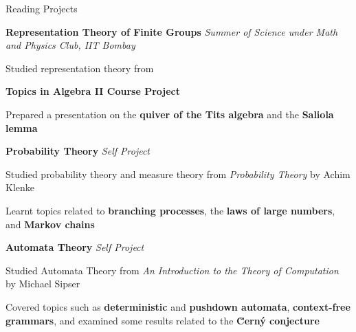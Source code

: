 \begin{rubric}{Reading Projects}

	\entry*[2022] \textbf{Representation Theory of Finite Groups} \hfill \emph{Summer of Science under Math and Physics Club, IIT Bombay}

		Studied representation theory from

		

	\entry*[2020\phantom{}] \textbf{Topics in Algebra II Course Project}

		Prepared a presentation on the \textbf{quiver of the Tits algebra} and the \textbf{Saliola lemma}

	\entry*[2020] \textbf{Probability Theory} \hfill \textit{Self Project}

		Studied probability theory and measure theory from \textit{Probability Theory} by Achim Klenke

		Learnt topics related to \textbf{branching processes}, the \textbf{laws of large numbers}, and \textbf{Markov chains}

	\entry*[2020\phantom{}] \textbf{Automata Theory} \hfill \textit{Self Project}

		Studied Automata Theory from \textit{An Introduction to the Theory of Computation} by Michael Sipser
        
        Covered topics such as \textbf{deterministic} and \textbf{pushdown automata}, \textbf{context-free grammars}, and examined some results related to the \textbf{\u{C}ern\'{y} conjecture}
\end{rubric}